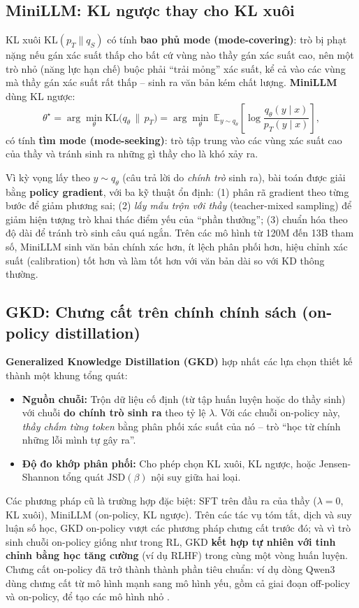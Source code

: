 \subsection{MiniLLM: KL ngược thay cho KL xuôi}
\label{ssec:minillm}
KL xuôi $\text{KL}(p_T\|q_S)$ có tính \textbf{bao phủ mode (mode-covering)}: trò bị phạt nặng nếu gán xác suất thấp cho bất cứ vùng nào thầy gán xác suất cao, nên một trò nhỏ (năng lực hạn chế) buộc phải “trải mỏng” xác suất, kể cả vào các vùng mà thầy gán xác suất rất thấp -- sinh ra văn bản kém chất lượng. \textbf{MiniLLM} \cite{gu2024minillm} dùng KL ngược:
\[
\theta^\star = \arg\min_\theta \text{KL}\big(q_\theta \,\|\, p_T\big) = \arg\min_\theta \; \mathbb{E}_{y\sim q_\theta}\left[\log\frac{q_\theta(y\mid x)}{p_T(y\mid x)}\right],
\]
có tính \textbf{tìm mode (mode-seeking)}: trò tập trung vào các vùng xác suất cao của thầy và tránh sinh ra những gì thầy cho là khó xảy ra.

Vì kỳ vọng lấy theo $y \sim q_\theta$ (câu trả lời do \emph{chính trò} sinh ra), bài toán được giải bằng \textbf{policy gradient}, với ba kỹ thuật ổn định: (1) phân rã gradient theo từng bước để giảm phương sai; (2) \emph{lấy mẫu trộn với thầy} (teacher-mixed sampling) để giảm hiện tượng trò khai thác điểm yếu của “phần thưởng”; (3) chuẩn hóa theo độ dài để tránh trò sinh câu quá ngắn. Trên các mô hình từ 120M đến 13B tham số, MiniLLM sinh văn bản chính xác hơn, ít lệch phân phối hơn, hiệu chỉnh xác suất (calibration) tốt hơn và làm tốt hơn với văn bản dài so với KD thông thường.

\subsection{GKD: Chưng cất trên chính chính sách (on-policy distillation)}
\label{ssec:gkd}
\textbf{Generalized Knowledge Distillation (GKD)} \cite{agarwal2024gkd} hợp nhất các lựa chọn thiết kế thành một khung tổng quát:
\begin{itemize}
	\item \textbf{Nguồn chuỗi:} Trộn dữ liệu cố định (từ tập huấn luyện hoặc do thầy sinh) với chuỗi \textbf{do chính trò sinh ra} theo tỷ lệ $\lambda$. Với các chuỗi on-policy này, \emph{thầy chấm từng token} bằng phân phối xác suất của nó -- trò “học từ chính những lỗi mình tự gây ra”.
	\item \textbf{Độ đo khớp phân phối:} Cho phép chọn KL xuôi, KL ngược, hoặc Jensen-Shannon tổng quát $\text{JSD}(\beta)$ nội suy giữa hai loại.
\end{itemize}
Các phương pháp cũ là trường hợp đặc biệt: SFT trên đầu ra của thầy ($\lambda=0$, KL xuôi), MiniLLM (on-policy, KL ngược). Trên các tác vụ tóm tắt, dịch và suy luận số học, GKD on-policy vượt các phương pháp chưng cất trước đó; và vì trò sinh chuỗi on-policy giống như trong RL, GKD \textbf{kết hợp tự nhiên với tinh chỉnh bằng học tăng cường} (ví dụ RLHF) trong cùng một vòng huấn luyện. Chưng cất on-policy đã trở thành thành phần tiêu chuẩn: ví dụ dòng Qwen3 dùng chưng cất từ mô hình mạnh sang mô hình yếu, gồm cả giai đoạn off-policy và on-policy, để tạo các mô hình nhỏ \cite{yang2025qwen3}.

